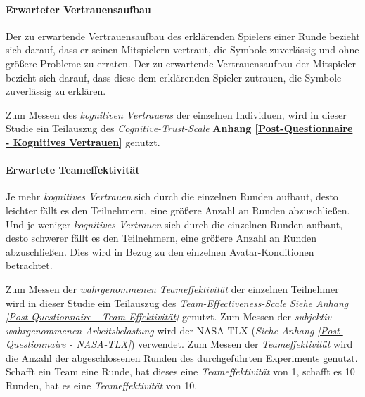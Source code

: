 \documentclass[a4paper,11pt]{article}%
\renewcommand{\\}{\vspace*{0.5\baselineskip} \newline}
\begin{document}
\paragraph{Erwarteter Vertrauensaufbau}
Der zu erwartende Vertrauensaufbau des erklärenden Spielers einer Runde bezieht sich darauf, dass er seinen Mitspielern vertraut, die Symbole zuverlässig und ohne größere Probleme zu erraten. Der zu erwartende Vertrauensaufbau der Mitspieler bezieht sich darauf, dass diese dem erklärenden Spieler zutrauen, die Symbole zuverlässig zu erklären.

Zum Messen des \textit{kognitiven Vertrauens} der einzelnen Individuen, wird in dieser Studie ein Teilauszug des \textit{Cognitive-Trust-Scale} \citep[S. 37]{mcallister1995affect} \textbf{Anhang \ref{Post-Questionnaire - Kognitives Vertrauen}} genutzt.

\paragraph{Erwartete Teameffektivität}
Je mehr \textit{kognitives Vertrauen} sich durch die einzelnen Runden aufbaut, desto leichter fällt es den Teilnehmern, eine größere Anzahl an Runden abzuschließen. Und je weniger \textit{kognitives Vertrauen} sich durch die einzelnen Runden aufbaut, desto schwerer fällt es den Teilnehmern, eine größere Anzahl an Runden abzuschließen. Dies wird in Bezug zu den einzelnen Avatar-Konditionen betrachtet.

Zum Messen der \textit{wahrgenommenen Teameffektivität} der einzelnen Teilnehmer wird in dieser Studie ein Teilauszug des \textit{Team-Effectiveness-Scale} \textit{Siehe Anhang \ref{Post-Questionnaire - Team-Effektivität}} \citep[S. 469]{gibson2003team} genutzt.  Zum Messen der \textit{subjektiv wahrgenommenen Arbeitsbelastung} wird der NASA-TLX (\textit{Siehe Anhang \ref{Post-Questionnaire - NASA-TLX}}) \citep{NASATLX} verwendet.
Zum Messen der \textit{Teameffektivität} wird die Anzahl der abgeschlossenen Runden des durchgeführten Experiments genutzt. Schafft ein Team eine Runde, hat dieses eine \textit{Teameffektivität} von 1, schafft es 10 Runden, hat es eine \textit{Teameffektivität} von 10.

\newpage
\end{document}
